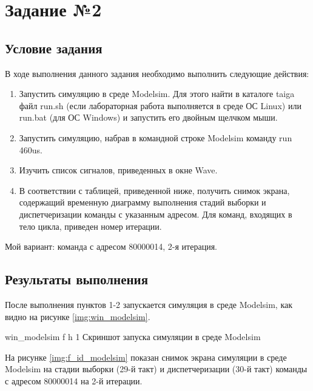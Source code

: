 \clearpage
\section{Задание №2}

\subsection*{Условие задания}

В ходе выполнения данного задания необходимо выполнить следующие действия:

\begin{enumerate}[label=\arabic*)]
\item Запустить симуляцию в среде Modelsim. Для этого найти в каталоге taiga файл run.sh (если лабораторная работа выполняется в среде ОС Linux) или run.bat (для ОС Windows) и запустить его двойным щелчком мыши.
\item Запустить симуляцию, набрав в командной строке Modelsim команду run 460us.
\item Изучить список сигналов, приведенных в окне Wave.
\item В соответствии с таблицей, приведенной ниже, получить снимок экрана, содержащий
временную диаграмму выполнения стадий выборки и диспетчеризации команды с
указанным адресом. Для команд, входящих в тело цикла, приведен номер итерации.
\end{enumerate}

Мой вариант: команда с адресом 80000014, 2-я итерация.

\clearpage

\subsection*{Результаты выполнения}

После выполнения пунктов 1-2 запускается симуляция в среде Modelsim, как видно на рисунке \ref{img:win_modelsim}.

{win_modelsim} %
{f} %
{h} %
{1\textwidth} %
{Скриншот запуска симуляции в среде Modelsim} %

\clearpage

На рисунке \ref{img:f_id_modelsim}  показан снимок экрана симуляции в среде Modelsim на стадии выборки (29-й такт) и диспетчеризации (30-й такт) команды с адресом 80000014 на 2-й итерации.

